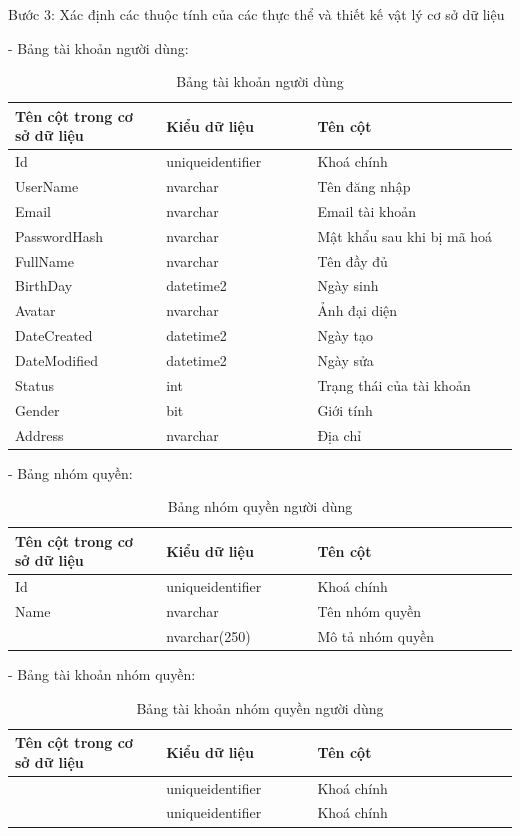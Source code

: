Bước 3: Xác định các thuộc tính của các thực thể và thiết kế vật lý cơ sở dữ liệu
\par
- Bảng tài khoản người dùng:
\begin{longtable}[htp]{ |m{0.3\linewidth}|m{0.3\linewidth}|m{0.4\linewidth}|}
 \caption{Bảng tài khoản người dùng \label{database}}\\
 \hline
 Tên cột trong cơ sở dữ liệu & Kiểu dữ liệu & Tên cột  \\
 \hline
  Id&uniqueidentifier&Khoá chính\\
 \hline
  UserName&nvarchar&Tên đăng nhập\\
 \hline
  Email&nvarchar&Email tài khoản\\
 \hline
  PasswordHash&nvarchar&Mật khẩu sau khi bị mã hoá\\
 \hline
  FullName&nvarchar&Tên đầy đủ\\
 \hline
  BirthDay&datetime2&Ngày sinh\\
 \hline
  Avatar&nvarchar&Ảnh đại diện\\
 \hline
  DateCreated&datetime2&Ngày tạo\\
 \hline
  DateModified&datetime2&Ngày sửa\\
 \hline
  Status&int&Trạng thái của tài khoản\\
 \hline
  Gender&bit&Giới tính\\
 \hline
  Address&nvarchar&Địa chỉ\\
 \hline
\end{longtable}
\par
- Bảng nhóm quyền:
\begin{longtable}[htp]{ |m{0.3\linewidth}|m{0.3\linewidth}|m{0.4\linewidth}|}
 \caption{Bảng nhóm quyền người dùng \label{database}}\\
 \hline
 Tên cột trong cơ sở dữ liệu & Kiểu dữ liệu & Tên cột  \\
 \hline
  Id&uniqueidentifier&Khoá chính\\
 \hline
  Name&nvarchar&Tên nhóm quyền\\
 \hline
  [Description]&nvarchar(250)&Mô tả nhóm quyền\\
 \hline
\end{longtable}

- Bảng tài khoản nhóm quyền:
\begin{longtable}[htp]{ |m{0.3\linewidth}|m{0.3\linewidth}|m{0.4\linewidth}|}
 \caption{Bảng tài khoản nhóm quyền người dùng \label{database}}\\
 \hline
 Tên cột trong cơ sở dữ liệu & Kiểu dữ liệu & Tên cột  \\
 \hline
  [UserId]&uniqueidentifier&Khoá chính\\
 \hline
  [RoleId]&uniqueidentifier&Khoá chính\\
 \hline
\end{longtable}

